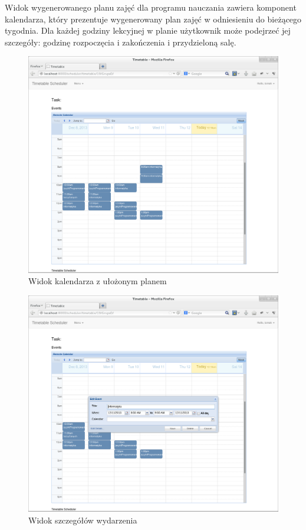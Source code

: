 \par Widok wygenerowanego planu zajęć dla programu nauczania zawiera komponent kalendarza, który prezentuje wygenerowany plan zajęć w odniesieniu do bieżącego tygodnia. Dla każdej godziny lekcyjnej w planie użytkownik może podejrzeć jej szczegóły: godzinę rozpoczęcia i zakończenia i przydzieloną salę.
\begin{figure}[H]
\centering
\includegraphics[width=13cm]{img/guide/user7.png}
\caption{Widok kalendarza z ułożonym planem}
\end{figure}
\begin{figure}[H]
\centering
\includegraphics[width=13cm]{img/guide/user9.png}
\caption{Widok szczegółów wydarzenia}
\end{figure}